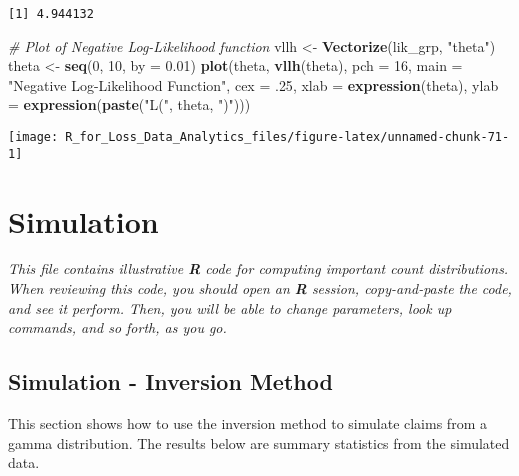 \documentclass[]{book}
\newenvironment{Shaded}{\begin{snugshade}}{\end{snugshade}}
\newcommand{\KeywordTok}[1]{\textcolor[rgb]{0.13,0.29,0.53}{\textbf{#1}}}
\newcommand{\DataTypeTok}[1]{\textcolor[rgb]{0.13,0.29,0.53}{#1}}
\newcommand{\DecValTok}[1]{\textcolor[rgb]{0.00,0.00,0.81}{#1}}
\newcommand{\FloatTok}[1]{\textcolor[rgb]{0.00,0.00,0.81}{#1}}
\newcommand{\StringTok}[1]{\textcolor[rgb]{0.31,0.60,0.02}{#1}}
\newcommand{\CommentTok}[1]{\textcolor[rgb]{0.56,0.35,0.01}{\textit{#1}}}
\newcommand{\NormalTok}[1]{#1}
\theoremstyle{definition}
\theoremstyle{definition}
\theoremstyle{definition}
\theoremstyle{remark}
\begin{document}
\begin{verbatim}
[1] 4.944132
\end{verbatim}

\begin{Shaded}
\begin{Highlighting}[]
\CommentTok{# Plot of Negative Log-Likelihood function }
\NormalTok{vllh <-}\StringTok{ }\KeywordTok{Vectorize}\NormalTok{(lik_grp, }\StringTok{"theta"}\NormalTok{)}
\NormalTok{theta <-}\StringTok{ }\KeywordTok{seq}\NormalTok{(}\DecValTok{0}\NormalTok{, }\DecValTok{10}\NormalTok{, }\DataTypeTok{by =} \FloatTok{0.01}\NormalTok{)}
\KeywordTok{plot}\NormalTok{(theta, }\KeywordTok{vllh}\NormalTok{(theta), }\DataTypeTok{pch =} \DecValTok{16}\NormalTok{, }\DataTypeTok{main =} \StringTok{"Negative Log-Likelihood Function"}\NormalTok{, }\DataTypeTok{cex =}\NormalTok{ .}\DecValTok{25}\NormalTok{, }
     \DataTypeTok{xlab =} \KeywordTok{expression}\NormalTok{(theta), }\DataTypeTok{ylab =} \KeywordTok{expression}\NormalTok{(}\KeywordTok{paste}\NormalTok{(}\StringTok{"L("}\NormalTok{, theta, }\StringTok{")"}\NormalTok{)))}
\end{Highlighting}
\end{Shaded}

\begin{center}\texttt{[image: R\_for\_Loss\_Data\_Analytics\_files/figure-latex/unnamed-chunk-71-1]} \end{center}

\chapter{Simulation}\label{simulation}

\emph{This file contains illustrative \textbf{R} code for computing
important count distributions. When reviewing this code, you should open
an \textbf{R} session, copy-and-paste the code, and see it perform.
Then, you will be able to change parameters, look up commands, and so
forth, as you go. }

\section{Simulation - Inversion
Method}\label{simulation---inversion-method}

This section shows how to use the inversion method to simulate claims
from a gamma distribution. The results below are summary statistics from
the simulated data.
\end{document}
